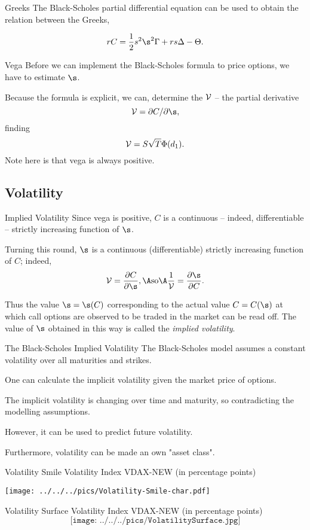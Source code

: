 Greeks
	The Black-Scholes partial differential equation can be used to
	obtain the relation between the Greeks,

	$$
	r C = \frac{1}{2} s^2 \s^2 \Gamma +rs \Delta -\Theta.
	$$


Vega
	Before we can implement the Black-Scholes formula to price options, we have to estimate $\s$.

	Because the formula is explicit, we can, determine the ${\cal V}$ -- the partial derivative
		$$
		{\cal V} = \partial C/\partial \s,
		$$
	finding
		$$
		{\cal V} = S \sqrt{T} \Phi(d_1).
		$$
	Note here is that vega is always positive.


\subsection{Volatility}

Implied Volatility
	Since vega is positive, $C$ is a continuous -- indeed,
	differentiable -- strictly increasing function of $\s$.
 
	Turning this round, $\s$ is a continuous (differentiable) strictly
	increasing function of $C$; indeed,
		$$
		{\cal V} = \frac{\partial C}{\partial \s}, \A \mbox{so} \A
		\frac{1}{\cal V} = \frac{\partial \s}{\partial C}.
		$$

	Thus the value $\s = \s(C)$ corresponding to the actual value $C =
	C(\s)$ at which call options are observed to be traded in the
	market can be read off.  The value of $\s$ obtained in this way is
	called the {\it implied volatility}.


The Black-Scholes Implied Volatility
	The Black-Scholes model assumes a constant volatility over all maturities and strikes.
	
	One can calculate the implicit volatility given the market price of options.
	
	The implicit volatility is changing over time and maturity, so contradicting the modelling assumptions.
	
	However, it can be used to predict future volatility.
	
	Furthermore, volatility can be made an own "asset class".


Volatility Smile
	Volatility Index VDAX-NEW (in percentage points)
	\begin{center}
	\texttt{[image: ../../../pics/Volatility-Smile-char.pdf]}
	\end{center}


Volatility Surface
	Volatility Index VDAX-NEW (in percentage points)
	$$\texttt{[image: ../../../pics/VolatilitySurface.jpg]}$$



